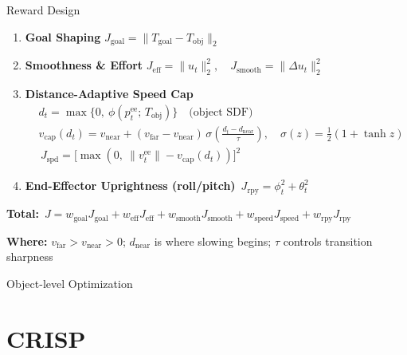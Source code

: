\documentclass[10pt, aspectratio=169]{beamer}
\begin{document}
\begin{frame}{Reward Design}
    \small
    \begin{enumerate}
      \item \textbf{Goal Shaping} $J_{\text{goal}} = \|T_{\text{goal}} - T_{\text{obj}}\|_2$
      \item \textbf{Smoothness \& Effort} $J_{\text{eff}} = \|u_t\|_2^2,\quad J_{\text{smooth}} = \|\Delta u_t\|_2^2$
    
      \item \textbf{Distance-Adaptive Speed Cap}  
      \[
      \begin{aligned}
      &d_t = \max\{0,\ \phi(p^{\mathrm{ee}}_t;\,T_{\text{obj}})\} \quad \text{(object SDF)} \\
      &v_{\text{cap}}(d_t) = v_{\text{near}} + (v_{\text{far}}-v_{\text{near}})\,
        \sigma\!\left(\frac{d_t - d_{\text{near}}}{\tau}\right),\quad
        \sigma(z)=\tfrac{1}{2}(1+\tanh z) \\
      &\boxed{\,J_{\text{spd}} = \big[\max(0,\ \|v^{\mathrm{ee}}_t\| - v_{\text{cap}}(d_t))\big]^2\,}
      \end{aligned}
      \]
    
      \item \textbf{End-Effector Uprightness (roll/pitch)} $\,J_{\text{rpy}} = \phi_t^2 + \theta_t^2 $ \
    \end{enumerate}
    
    \medskip
    \textbf{Total:}\,
    $J = w_{\text{goal}} J_{\text{goal}}
     + w_{\text{eff}} J_{\text{eff}}
     + w_{\text{smooth}} J_{\text{smooth}}
     + w_{\text{speed}} J_{\text{speed}}
     + w_{\text{rpy}} J_{\text{rpy}}$
    
    \medskip
    \textbf{Where:}
    $v_{\text{far}}>v_{\text{near}}>0$; $d_{\text{near}}$ is where slowing begins; $\tau$ controls transition sharpness
\end{frame}

\begin{frame}[plain]
  \centering
  \Huge Object-level Optimization
\end{frame}

\section{CRISP}
\end{document}
